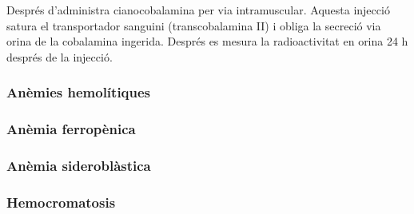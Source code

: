 
Després d'administra cianocobalamina per via intramuscular. Aquesta injecció satura el transportador sanguini (transcobalamina II) i obliga la secreció via orina de la cobalamina ingerida. Després es mesura la radioactivitat en orina 24 h després de la injecció.

\subsubsection{Anèmies hemolítiques}

\subsubsection{Anèmia ferropènica}


\subsubsection{Anèmia sideroblàstica}


\subsubsection{Hemocromatosis}